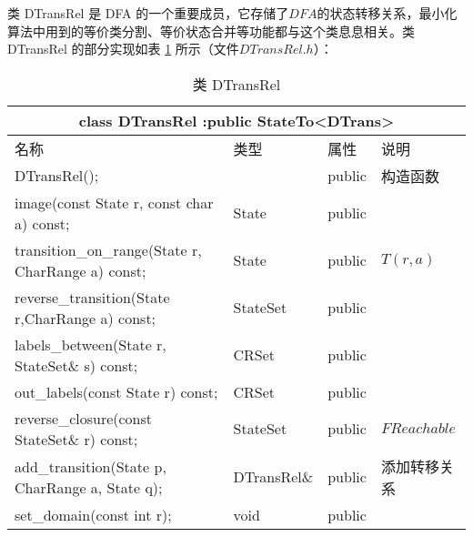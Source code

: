 类 DTransRel 是 DFA 的一个重要成员，它存储了$DFA$的状态转移关系，最小化算法中用到的等价类分割、等价状态合并等功能都与这个类息息相关。类 DTransRel 的部分实现如表 \ref{tab:Class-DTransRel} 所示（文件$DTransRel.h$）：

\begin{table}[!htbp]
    \caption{类 DTransRel}
    \label{tab:Class-DTransRel}
    \centering
    \small%
    \setlength{\tabcolsep}{4pt}%
    \renewcommand{\arraystretch}{1.2}%
        \begin{tabular}{llll} %
        \toprule 
         \multicolumn{4}{c}{class DTransRel :public StateTo<DTrans>} \\
        \midrule
        名称& 类型 & 属性  &\mbox{说明} \\
        \midrule 
        DTransRel(); &  &  public & 构造函数 \\
        image(const State r, const char a) const; & State & public & \\
        transition\_on\_range(State r, CharRange a) const; & State & public & $T(r,a)$\\
        reverse\_transition(State r,CharRange a) const; & StateSet & public & \\
        labels\_between(State r, StateSet\& s) const; & CRSet & public & \\
        out\_labels(const State r) const; & CRSet & public & \\
        reverse\_closure(const StateSet\& r) const; & StateSet & public & $FReachable$ \\
        add\_transition(State p, CharRange a, State q); & DTransRel\& & public & 添加转移关系 \\
        set\_domain(const int r); & void & public & \\
        \bottomrule 
    \end{tabular}
\end{table}


